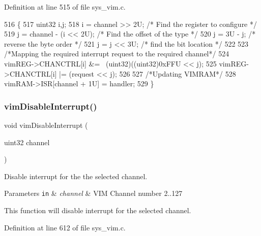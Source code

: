 Definition at line 515 of file sys\+\_\+vim.\+c.


\begin{DoxyCode}
516 \{
517     uint32 i,j;
518     i = channel >> 2U;              \textcolor{comment}{/* Find the register to configure */}
519     j = channel - (i << 2U);        \textcolor{comment}{/* Find the offset of the type    */}
520     j = 3U - j;                     \textcolor{comment}{/* reverse the byte order         */}
521     j = j << 3U;                    \textcolor{comment}{/* find the bit location          */}
522 
523     \textcolor{comment}{/*Mapping the required interrupt request to the required channel*/}
524     vimREG->CHANCTRL[i] &= ~(uint32)((uint32)0xFFU << j);
525     vimREG->CHANCTRL[i] |= (request << j);
526 
527     \textcolor{comment}{/*Updating VIMRAM*/}
528     vimRAM->ISR[channel + 1U] = handler;
529 \}
\end{DoxyCode}
\mbox{\label{group__VIM_gac4c74a2a1d17f9c7ec4cc3ba156a230e}} 
\subsubsection{\texorpdfstring{vim\+Disable\+Interrupt()}{vimDisableInterrupt()}}
{\footnotesize\ttfamily void vim\+Disable\+Interrupt (\begin{DoxyParamCaption}\item[{uint32}]{channel }\end{DoxyParamCaption})}



Disable interrupt for the the selected channel. 


\begin{DoxyParams}[1]{Parameters}
\mbox{\tt in}  & {\em channel} & V\+IM Channel number 2..127\\
\hline
\end{DoxyParams}
This function will disable interrupt for the selected channel. 

Definition at line 612 of file sys\+\_\+vim.\+c.



